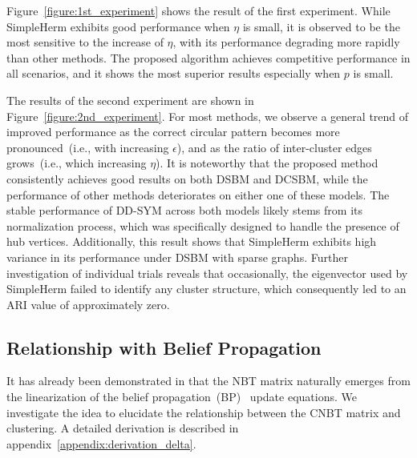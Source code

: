 \documentclass{article}
\theoremstyle{plain}
\begin{document}
Figure~\ref{figure:1st_experiment} shows the result of the first experiment. While SimpleHerm exhibits good performance when $\eta$ is small, it is observed to be the most sensitive to the increase of $\eta$, with its performance degrading more rapidly than other methods.
The proposed algorithm achieves competitive performance in all scenarios, and it shows the most superior results especially when $p$ is small.

The results of the second experiment are shown in Figure~\ref{figure:2nd_experiment}.
For most methods, we observe a general trend of improved performance as the correct circular pattern becomes more pronounced~(i.e., with increasing $\epsilon$), and as the ratio of inter-cluster edges grows~(i.e., which increasing $\eta$).
It is noteworthy that the proposed method consistently achieves good results on both DSBM and DCSBM,
while the performance of other methods deteriorates on either one of these models.
The stable performance of DD-SYM across both models likely stems from its normalization process,
which was specifically designed to handle the presence of hub vertices.
Additionally, this result shows that SimpleHerm exhibits high variance in its performance under DSBM with sparse graphs.
Further investigation of individual trials reveals that occasionally, the eigenvector used by SimpleHerm failed to identify any cluster structure, which consequently led to an ARI value of approximately zero.

\subsection{Relationship with Belief Propagation}

It has already been demonstrated in \citep{Krzakala2013-up,Decelle2011-ir} that the NBT matrix naturally emerges from the linearization of the belief propagation~(BP)~\citep{Andersen1991-go,Mezard2009-ku} update equations. We investigate the idea to elucidate the relationship between the CNBT matrix and clustering.
A detailed derivation is described in appendix~\ref{appendix:derivation_delta}.
\end{document}
